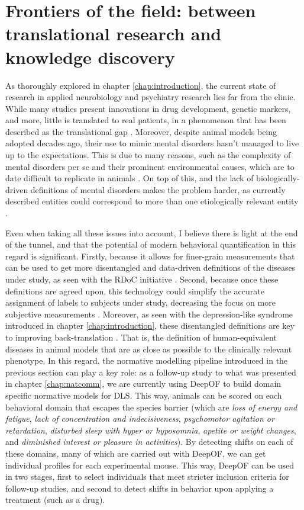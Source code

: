 \section{Frontiers of the field: between translational research and knowledge discovery}

As thoroughly explored in chapter \ref{chap:introduction}, the current state of research in applied neurobiology and psychiatry research lies far from the clinic. While many studies present innovations in drug development, genetic markers, and more, little is translated to real patients, in a phenomenon that has been described as the translational gap \cite{Shemesh2023ANeuroethology}. Moreover, despite animal models being adopted decades ago, their use to mimic mental disorders hasn’t managed to live up to the expectations. This is due to many reasons, such as the complexity of mental disorders per se and their prominent environmental causes, which are to date difficult to replicate in animals \cite{vonMucke-Heim2022IntroducingMice}. On top of this, and the lack of biologically-driven definitions of mental disorders makes the problem harder, as currently described entities could correspond to more than one etiologically relevant entity \cite{Miranda2021SystematicSubtyping}.

Even when taking all these issues into account, I believe there is light at the end of the tunnel, and that the potential of modern behavioral quantification in this regard is significant. Firstly, because it allows for finer-grain measurements that can be used to get more disentangled and data-driven definitions of the diseases under study, as seen with the RDoC initiative \cite{Vilar2019TranslationalRDoC}. Second, because once these definitions are agreed upon, this technology could simplify the accurate assignment of labels to subjects under study, decreasing the focus on more subjective measurements \cite{Miranda2021SystematicSubtyping}. Moreover, as seen with the depression-like syndrome introduced in chapter \ref{chap:introduction}, these disentangled definitions are key to improving back-translation \cite{vonMucke-Heim2022IntroducingMice}. That is, the definition of human-equivalent diseases in animal models that are as close as possible to the clinically relevant phenotype. In this regard, the normative modelling pipeline introduced in the previous section can play a key role: as a follow-up study to what was presented in chapter \ref{chap:natcomm}, we are currently using DeepOF to build domain specific normative models for DLS. This way, animals can be scored on each behavioral domain that escapes the species barrier (which are \textit{loss of energy and fatigue}, \textit{lack of concentration and indecisiveness}, \textit{psychomotor agitation or retardation}, \textit{disturbed sleep with hyper or hyposomnia}, \textit{apetite or weight changes}, and \textit{diminished interest or pleasure in activities}). By detecting shifts on each of these domains, many of which are carried out with DeepOF, we can get individual profiles for each experimental mouse. This way, DeepOF can be used in two stages, first to select individuals that meet stricter inclusion criteria for follow-up studies, and second to detect shifts in behavior upon applying a treatment (such as a drug).

